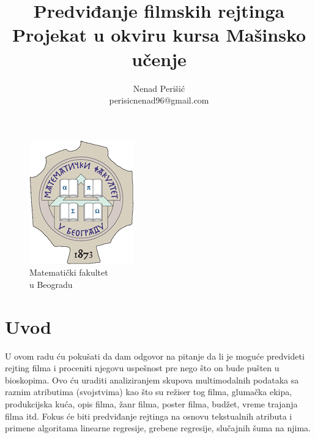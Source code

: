 \documentclass[a4paper]{article}
\begin{document}
\title{\textbf{Predviđanje filmskih rejtinga}\\
\small{Projekat u okviru kursa Mašinsko učenje}}

\author{Nenad Perišić\\perisicnenad96@gmail.com\\}

\medskip

\newpage

\maketitle


\vspace{2cm}
\begin{figure}[b!]
\begin{center}
\includegraphics[scale=0.67]{matf_logo.png} \\
\small{Matematički fakultet \\ u Beogradu}
\end{center}
\end{figure}


\pagebreak

\tableofcontents

\newpage

\section{Uvod}
\label{sec:uvod}

U ovom radu ću pokušati da dam odgovor na pitanje da li je moguće predvideti rejting filma i proceniti njegovu uspešnost pre nego što on bude pušten u bioskopima. Ovo ću uraditi analiziranjem skupova multimodalnih podataka sa raznim atributima (svojstvima) kao što su režiser tog filma, glumačka ekipa, produkcijska kuća, opis filma, žanr filma, poster filma, budžet, vreme trajanja filma itd. Fokus će biti predviđanje rejtinga na osnovu tekstualnih atributa i primene algoritama linearne regresije, grebene regresije, slučajnih šuma na njima.
\end{document}
